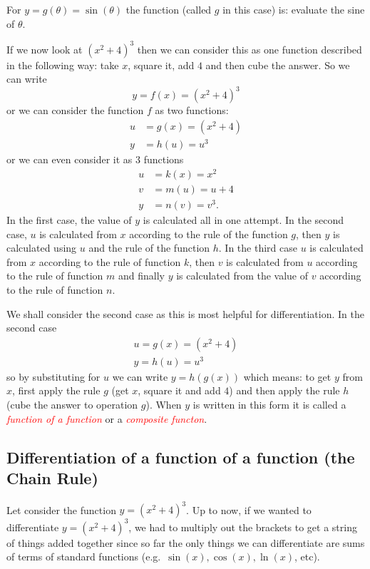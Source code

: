 \documentclass[
  11pt,
  oneside]{book}
\newcommand{\slide}{}
\theoremstyle{definition}
\theoremstyle{definition}
\theoremstyle{definition}
\theoremstyle{definition}
\theoremstyle{remark}
\begin{document}
For \(y = g(\theta) = \sin(\theta)\) the function (called \(g\) in this case) is: evaluate the sine of \(\theta\).

If we now look at \((x^2 + 4)^3\) then we can consider this as one function described in the following way: take \(x\), square it, add \(4\) and then cube the answer. So we can write
\[
y = f(x) = (x^2+ 4)^3
\]
or we can consider the function \(f\) as two functions:
\begin{align*}
u &= g(x) = (x^2 + 4)\\
y &= h(u) = u^3
\end{align*}
or we can even consider it as 3 functions
\begin{align*}
u &= k(x) = x^2\\
v &= m(u) = u + 4\\
y &= n(v) = v^3.
\end{align*}
In the first case, the value of \(y\) is calculated all in one attempt. In the second case, \(u\) is calculated from \(x\) according to the rule of the function \(g\), then \(y\) is calculated using \(u\) and the rule of the function \(h\). In the third case \(u\) is calculated from \(x\) according to the rule of function \(k\), then \(v\) is calculated from \(u\) according to the rule of function \(m\) and finally \(y\) is calculated from the value of \(v\) according to the rule of function \(n\).

We shall consider the second case as this is most helpful for differentiation. In the second case
\begin{gather*}
u = g(x) = (x^2+ 4)\\
y = h(u) = u^3
\end{gather*}
so by substituting for \(u\) we can write \(y = h(g(x))\) which means: to get \(y\) from \(x\), first apply the rule \(g\) (get \(x\), square it and add \(4\)) and then apply the rule \(h\) (cube the answer to operation \(g\)). When \(y\) is written in this form it is called a \textcolor{red}{\em function of a function} or a \textcolor{red}{\em composite functon}.
\slide

\subsection{Differentiation of a function of a function (the Chain Rule)}\label{differentiation-of-a-function-of-a-function-the-chain-rule}

Let consider the function \(y = (x^2+ 4)^3\). Up to now, if we wanted to differentiate \(y = (x^2 + 4)^3\), we had to multiply out the brackets to get a string of things added together since so far the only things we can differentiate are sums of terms of standard functions (e.g.~\(\sin(x), \cos(x), \ln(x)\), etc).
\end{document}
